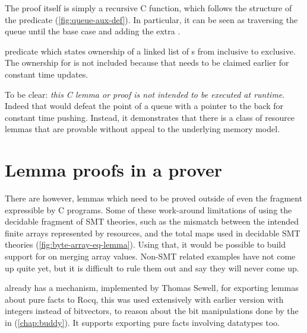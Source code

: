 
The proof itself is simply a recursive C function, which follows the structure
of the  predicate (\cref{fig:queue-aux-def}). In particular,
it can be seen as traversing the queue until the base case and adding the extra
.

\begin{marginfigure}
    \caption{ predicate which states ownership of a linked
    list of s from  inclusive to
     exclusive. The ownership for  is
    not included because that needs to be claimed earlier for constant time
    updates.}\label{fig:queue-aux-def}
\end{marginfigure}

To be clear: \emph{this C lemma or proof is not intended to be executed at
runtime}. Indeed that would defeat the point of a queue with a pointer to the
back for constant time pushing. Instead, it demonstrates that there is a class
of resource lemmas that are provable without appeal to the underlying memory
model.

\section{Lemma proofs in a prover}\label{sec:lemma-prover}

There are however, lemmas which need to be proved outside of even the fragment
expressible by C programs. Some of these work-around limitations of using the
decidable fragment of SMT theories, such as the mismatch between the intended
finite arrays represented by resources, and the total maps used in decidable
SMT theories (\cref{fig:byte-array-eq-lemma}). Using that, it would be possible
to build support for on merging array values. Non-SMT related examples have not
come up quite yet, but it is difficult to rule them out and say they will never
come up.

 already has a mechanism, implemented by Thomas Sewell, for exporting
lemmas about pure facts to Rocq, this was used extensively with earlier version
with integers instead of bitvectors, to reason about the bit manipulations done
by the  in  (\cref{chap:buddy}). It supports
exporting pure facts involving datatypes too.

